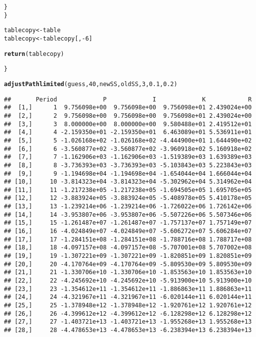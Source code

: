\documentclass{article}\usepackage[]{graphicx}\usepackage[]{color}
\makeatletter
\newcommand{\hlnum}[1]{\textcolor[rgb]{0.686,0.059,0.569}{#1}}%
\newcommand{\hlopt}[1]{\textcolor[rgb]{0,0,0}{#1}}%
\newcommand{\hlstd}[1]{\textcolor[rgb]{0.345,0.345,0.345}{#1}}%
\newcommand{\hlkwb}[1]{\textcolor[rgb]{0.69,0.353,0.396}{#1}}%
\newcommand{\hlkwd}[1]{\textcolor[rgb]{0.737,0.353,0.396}{\textbf{#1}}}%
\newenvironment{kframe}{%
 \def\at@end@of@kframe{}%
 \ifinner\ifhmode%
  \def\at@end@of@kframe{\end{minipage}}%
  \begin{minipage}{\columnwidth}%
 \fi\fi%
 \def\FrameCommand##1{\hskip\@totalleftmargin \hskip-\fboxsep
 \colorbox{shadecolor}{##1}\hskip-\fboxsep
     \hskip-\linewidth \hskip-\@totalleftmargin \hskip\columnwidth}%
 \MakeFramed {\advance\hsize-\width
   \@totalleftmargin\z@ \linewidth\hsize
   \@setminipage}}%
 {\par\unskip\endMakeFramed%
 \at@end@of@kframe}
\newenvironment{knitrout}{}{} %
\makeatother
\begin{document}
\begin{knitrout}
\begin{kframe}
\begin{alltt}
    \hlstd{\}}
  \hlstd{\}}

  \hlstd{tablecopy} \hlkwb{<-} \hlstd{table}
  \hlstd{tablecopy} \hlkwb{<-} \hlstd{tablecopy[,}\hlopt{-}\hlnum{6}\hlstd{]}

  \hlkwd{return}\hlstd{(tablecopy)}

\hlstd{\}}

\hlkwd{adjustPathlimited}\hlstd{(guess,} \hlnum{40}\hlstd{, newSS, oldSS,} \hlnum{3}\hlstd{,} \hlnum{0.1}\hlstd{,} \hlnum{0.2}\hlstd{)}
\end{alltt}
\begin{verbatim}
##       Period             P             I             K            R
##  [1,]      1  9.756098e+00  9.756098e+00  9.756098e+01 2.439024e+00
##  [2,]      2  9.756098e+00  9.756098e+00  9.756098e+01 2.439024e+00
##  [3,]      3  8.000000e+00  8.000000e+00  9.580488e+01 2.419512e+01
##  [4,]      4 -2.159350e+01 -2.159350e+01  6.463089e+01 5.536911e+01
##  [5,]      5 -1.026168e+02 -1.026168e+02 -4.444900e+01 1.644490e+02
##  [6,]      6 -3.560877e+02 -3.560877e+02 -3.960918e+02 5.160918e+02
##  [7,]      7 -1.162906e+03 -1.162906e+03 -1.519389e+03 1.639389e+03
##  [8,]      8 -3.736393e+03 -3.736393e+03 -5.103843e+03 5.223843e+03
##  [9,]      9 -1.194698e+04 -1.194698e+04 -1.654044e+04 1.666044e+04
## [10,]     10 -3.814323e+04 -3.814323e+04 -5.302962e+04 5.314962e+04
## [11,]     11 -1.217238e+05 -1.217238e+05 -1.694505e+05 1.695705e+05
## [12,]     12 -3.883924e+05 -3.883924e+05 -5.408978e+05 5.410178e+05
## [13,]     13 -1.239214e+06 -1.239214e+06 -1.726022e+06 1.726142e+06
## [14,]     14 -3.953807e+06 -3.953807e+06 -5.507226e+06 5.507346e+06
## [15,]     15 -1.261487e+07 -1.261487e+07 -1.757137e+07 1.757149e+07
## [16,]     16 -4.024849e+07 -4.024849e+07 -5.606272e+07 5.606284e+07
## [17,]     17 -1.284151e+08 -1.284151e+08 -1.788716e+08 1.788717e+08
## [18,]     18 -4.097157e+08 -4.097157e+08 -5.707001e+08 5.707002e+08
## [19,]     19 -1.307221e+09 -1.307221e+09 -1.820851e+09 1.820851e+09
## [20,]     20 -4.170764e+09 -4.170764e+09 -5.809530e+09 5.809530e+09
## [21,]     21 -1.330706e+10 -1.330706e+10 -1.853563e+10 1.853563e+10
## [22,]     22 -4.245692e+10 -4.245692e+10 -5.913900e+10 5.913900e+10
## [23,]     23 -1.354612e+11 -1.354612e+11 -1.886863e+11 1.886863e+11
## [24,]     24 -4.321967e+11 -4.321967e+11 -6.020144e+11 6.020144e+11
## [25,]     25 -1.378948e+12 -1.378948e+12 -1.920761e+12 1.920761e+12
## [26,]     26 -4.399612e+12 -4.399612e+12 -6.128298e+12 6.128298e+12
## [27,]     27 -1.403721e+13 -1.403721e+13 -1.955268e+13 1.955268e+13
## [28,]     28 -4.478653e+13 -4.478653e+13 -6.238394e+13 6.238394e+13

\end{verbatim}
\end{kframe}
\end{knitrout}
\end{document}

